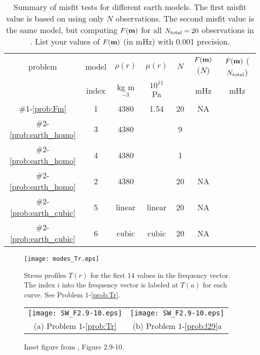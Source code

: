 \documentclass[11pt,titlepage,fleqn]{article}
\begin{document}
\begin{table}
\centering
\caption[]
{{
Summary of misfit tests for different earth models.
The first misfit value is based on using only $N$ observations.
The second misfit value is the same model, but computing $F(\mbox{${\bf m}$})$ for all $N_{\rm total}=20$ observations in .
List your values of $F(\mbox{${\bf m}$})$ (in mHz) with 0.001 precision.
\label{tab:homo}
}}
\begin{spacing}{1.5}
\begin{tabular}{||c|c|c|c|c|c||c|}
\hline
problem & model & $\rho(r)$ & $\mu(r)$ & $N$ & $F(\mbox{${\bf m}$})$ ($N$) & $F(\mbox{${\bf m}$})$ ($N_{\rm total}$) \\
& index & kg m$^{-3}$ & $10^{11}$ Pa & & mHz & mHz \\ \hline\hline
$\#$1-\ref{prob:Fm} & 1 & 4380 & 1.54 & 20 & NA &  \\  \hline
$\#$2-\ref{prob:earth_homo} & 3 & 4380 &      & 9  &  &  \\  \hline
$\#$2-\ref{prob:earth_homo} & 4 & 4380 &      & 1  &  &  \\  \hline
\hline
$\#$2-\ref{prob:earth_homo} & 2 & 4380 &      & 20 & NA  &  \\  \hline
$\#$2-\ref{prob:earth_cubic} & 5 & linear & linear & 20 & NA  & \\ \hline
$\#$2-\ref{prob:earth_cubic} & 6 & cubic & cubic & 20 & NA  & \\ \hline
\hline
\end{tabular}
\end{spacing}
\end{table}

\clearpage\pagebreak

\begin{figure}
\centering
\texttt{[image: modes\_Tr.eps]}
\caption[]
{{
Stress profiles $T(r)$  for the first 14 values in the frequency vector.
The index $i$ into the frequency vector is labeled at $T(a)$ for each curve.
See Problem 1-\ref{prob:Tr}.
\label{fig:Tr}
}}
\end{figure}

\begin{figure}
\hspace{-1cm}
\begin{tabular}{cc}
\texttt{[image: SW\_F2.9-10.eps]} &
\texttt{[image: SW\_F2.9-10.eps]} \\
(a) Problem 1-\ref{prob:Tr} & (b) Problem 1-\ref{prob:l29}a 
\end{tabular}
\caption[]
{{
Inset figure from \citet{SteinWysession}, Figure 2.9-10.
\label{fig:dots}
}}
\end{figure}

\end{document}
